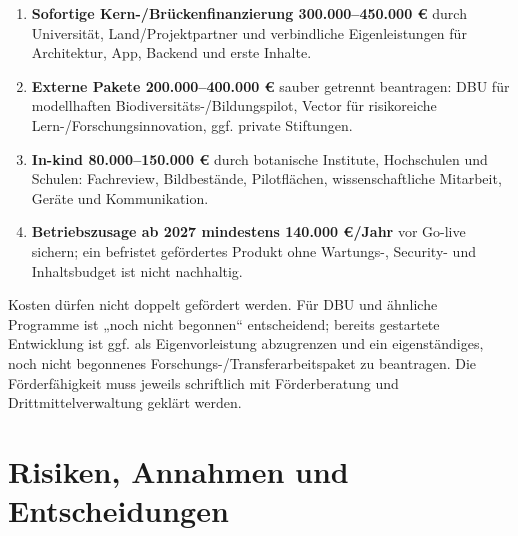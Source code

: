 \documentclass[10pt,a4paper,oneside]{article}
\begin{document}
\begin{decisionbox}[title={\textbf{Finanzierungsstrategie für den April-Go-live}}]
\begin{enumerate}[leftmargin=7mm,label=\textcolor{Forest}{\arabic*.}]
  \item \textbf{Sofortige Kern-/Brückenfinanzierung 300.000--450.000 €} durch Universität, Land/Projektpartner und verbindliche Eigenleistungen für Architektur, App, Backend und erste Inhalte.
  \item \textbf{Externe Pakete 200.000--400.000 €} sauber getrennt beantragen: DBU für modellhaften Biodiversitäts-/Bildungspilot, Vector für risikoreiche Lern-/Forschungsinnovation, ggf. private Stiftungen.
  \item \textbf{In-kind 80.000--150.000 €} durch botanische Institute, Hochschulen und Schulen: Fachreview, Bildbestände, Pilotflächen, wissenschaftliche Mitarbeit, Geräte und Kommunikation.
  \item \textbf{Betriebszusage ab 2027 mindestens 140.000 €/Jahr} vor Go-live sichern; ein befristet gefördertes Produkt ohne Wartungs-, Security- und Inhaltsbudget ist nicht nachhaltig.
\end{enumerate}
\end{decisionbox}

Kosten dürfen nicht doppelt gefördert werden. Für DBU und ähnliche Programme ist „noch nicht begonnen“ entscheidend; bereits gestartete Entwicklung ist ggf. als Eigenvorleistung abzugrenzen und ein eigenständiges, noch nicht begonnenes Forschungs-/Transferarbeitspaket zu beantragen. Die Förderfähigkeit muss jeweils schriftlich mit Förderberatung und Drittmittelverwaltung geklärt werden.

\section{Risiken, Annahmen und Entscheidungen}
\end{document}
